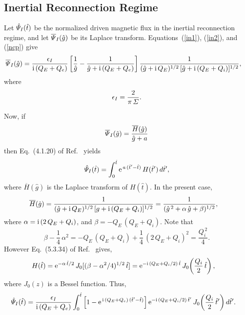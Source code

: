 \documentclass[12pt,prb,aps]{revtex4-1}
\begin{document}
\subsection{Inertial Reconnection Regime}\label{inertial}
Let $\hat{\mit\Psi}_{I}(\hat{t})$ be the normalized driven magnetic flux in the inertial reconnection regime, and let $\overline{\mit\Psi}_{I}(\hat{g})$ be its Laplace transform.
Equations~(\ref{in1}), (\ref{in2}), and (\ref{ncp}) give
\begin{align}
\overline{\mit\Psi}_{I}(\hat{g}) &= \frac{\epsilon_I}{{\rm i}\,(Q_E+Q_e)}\left[
\frac{1}{\hat{g}}- \frac{1}{\hat{g}+ {\rm i}\,(Q_E+Q_e)}\right]
\frac{1}{(\hat{g}+{\rm i}\,Q_E)^{1/2}\,[\hat{g} + {\rm i}\,(Q_E+Q_i)]^{1/2}},
\end{align}
where
\begin{align}
\epsilon_I = \frac{2}{\pi\,{\mit\Sigma}}.
\end{align}

Now, if
\begin{equation}
\overline{\mit\Psi}_{I}(\hat{g}) = \frac{\overline{H}(\hat{g})}{\hat{g} + a}
\end{equation}
then Eq.~(4.1.20) of Ref.~ yields
\begin{equation}
\hat{\mit\Psi}_{I}(\hat{t}) = \int_0^{\hat{t}}{\rm e}^{\,a\,(\hat{t}'-\hat{t})}\,H(\hat{t}')\,d\hat{t}',
\end{equation}
where $\overline{H}(\hat{g})$ is the Laplace transform of $H(\hat{t})$. 
In the present case,
\begin{align}
\overline{H}(\hat{g}) &= \frac{1}{(\hat{g}+{\rm i}\,Q_E)^{1/2}\,[g +{\rm i}\,(Q_E+Q_i)]^{1/2}}=\frac{1}{(\hat{g}^{\,2}  + \alpha\,\hat{g} + \beta)^{1/2}},
\end{align}
where
$\alpha = {\rm i}\,(2\,Q_E+Q_i)$, and 
$\beta= - Q_E\,(Q_E+Q_i)$.
Note that
\begin{equation}
\beta- \frac{1}{4}\,\alpha^2 = -Q_E\,(Q_E+Q_i) +\frac{1}{4}\,(2\,Q_E+Q_i)^2 = \frac{Q_i^{\,2}}{4}.
\end{equation}
However Eq.~(5.3.34) of Ref.~ gives, 
\begin{align}
H(\hat{t}) &= {\rm e}^{-\alpha\,\hat{t}/2}\,J_0[(\beta-\alpha^2/4)^{1/2}\,\hat{t}]= {\rm e}^{-{\rm i}\,(Q_E+Q_i/2)\,\hat{t}}\,J_0\!\left(\frac{Q_i}{2}\,\hat{t}\right),
\end{align}
where $J_0(z)$ is a Bessel function. 
Thus,
\begin{align}\label{inertialp}
\hat{\mit\Psi}_{I}(\hat{t}) &=\frac{\epsilon_I}{{\rm i}\,(Q_E+Q_e)}
\int_0^{\hat{t}}\left[1-{\rm e}^{\,{\rm i}\,(Q_E+Q_e)\,(\hat{t}'-\hat{t})}\right]
{\rm e}^{-{\rm i}\,(Q_E+Q_i/2)\,\hat{t}'}\,J_0\!\left(\frac{Q_i}{2}\,\hat{t}'\right)d\hat{t}'.
\end{align}
\end{document}
